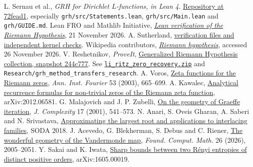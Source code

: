\documentclass[11pt]{article}
\newcommand{\repo}[2]{\href{#1}{#2}}
\begin{document}
\begin{thebibliography}{10}\small
{} L. Sernau et al., \emph{GRH for Dirichlet $L$-functions, in Lean 4}.
\repo{https://github.com/lsernau/grh-lean/tree/72fead102f663d5c7a407964a13dc0cf9d977207}{Repository at 72fead1},
especially \texttt{grh/src/Statements.lean}, \texttt{grh/src/Main.lean}
and \texttt{grh/GUIDE.md}.
 Lean FRO and Mathlib Initiative,
\repo{https://leanprover-community.github.io/blog/posts/riemann-hypothesis/}{\emph{Lean verification of the Riemann Hypothesis}}, 21 November 2026.
A. Sutherland, \repo{https://math.mit.edu/~drew/grh/}{verification files and independent kernel checks}.
 Wikipedia contributors, \repo{https://en.wikipedia.org/wiki/Riemann_hypothesis}{\emph{Riemann hypothesis}}, accessed 26 November 2026.
 V. Reshetnikov, \emph{ProveIt}, \repo{https://github.com/VladimirReshetnikov/ProveIt/tree/244c77760d4dd675372c5bda2438c135e2fc802d/Analysis/GeneralizedRiemannHypothesis}{Generalized Riemann Hypothesis collection, snapshot 244c777}.
See \repo{https://github.com/VladimirReshetnikov/ProveIt/blob/244c77760d4dd675372c5bda2438c135e2fc802d/Analysis/GeneralizedRiemannHypothesis/docs/incoming/li_ritz_zero_recovery.zip}{\texttt{li\_ritz\_zero\_recovery.zip}}
and \texttt{Research/grh\_method\_transfers\_research}.
 A. Voros, \repo{https://doi.org/10.5802/aif.1955}{Zeta functions for the Riemann zeros}, \emph{Ann. Inst. Fourier} 53 (2003), 665--699.
 A. Kawalec, \repo{https://arxiv.org/abs/2012.06581}{Analytical recurrence formulas for non-trivial zeros of the Riemann zeta function}, arXiv:2012.06581.
 G. Malajovich and J. P. Zubelli, \repo{https://arxiv.org/abs/math/9908149}{On the geometry of Graeffe iteration}, \emph{J. Complexity} 17 (2001), 541--573.
 N. Anari, S. Oveis Gharan, A. Saberi and N. Srivastava,
\repo{https://arxiv.org/abs/1704.03892}{Approximating the largest root and applications to interlacing families}, SODA 2018.
 J. Acevedo, G. Blekherman, S. Debus and C. Riener,
\repo{https://arxiv.org/abs/2303.09512}{The wonderful geometry of the Vandermonde map},
\emph{Found. Comput. Math.} 26 (2026), 2005--2051.
 Y. Sakai and K. Iwata, \repo{https://arxiv.org/abs/1605.00019}{Sharp bounds between two R\'enyi entropies of distinct positive orders}, arXiv:1605.00019.
\end{thebibliography}
\end{document}
